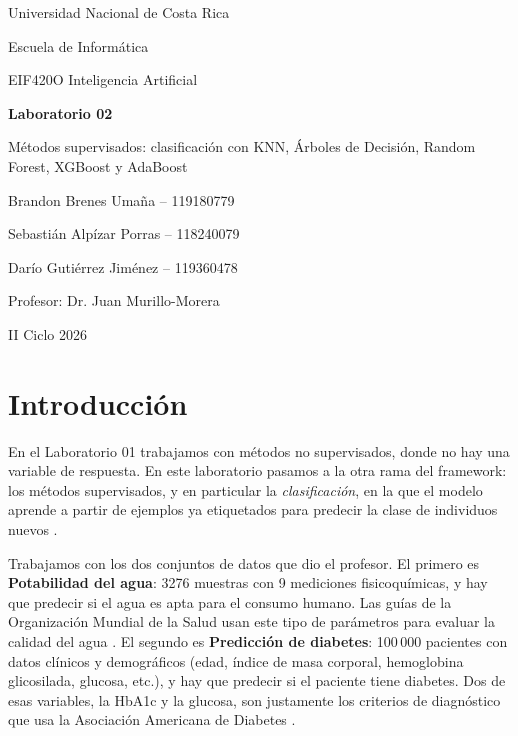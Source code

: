 \documentclass[11pt,a4paper]{article}
\let\citepOriginal\citep
\renewcommand*{\citep}[1]{\textbf{\citepOriginal{#1}}}%
\begin{document}
\begin{titlepage}
\centering
{\large Universidad Nacional de Costa Rica\par}
{\large Escuela de Informática\par}
{\large EIF420O Inteligencia Artificial\par}
\vspace{4cm}
{\LARGE\bfseries Laboratorio 02\par}
\vspace{0.5cm}
{\Large Métodos supervisados: clasificación con KNN, Árboles de Decisión, Random Forest, XGBoost y AdaBoost\par}
\vspace{4cm}
{\large Brandon Brenes Umaña -- 119180779\par}
{\large Sebastián Alpízar Porras -- 118240079\par}
{\large Darío Gutiérrez Jiménez -- 119360478\par}
\vspace{2cm}
{\large Profesor: Dr. Juan Murillo-Morera\par}
\vfill
{\large II Ciclo 2026\par}
\end{titlepage}

\tableofcontents
\newpage

\section{Introducción}

En el Laboratorio 01 trabajamos con métodos no supervisados, donde no hay una variable de respuesta. En este laboratorio pasamos a la otra rama del framework: los métodos supervisados, y en particular la \textit{clasificación}, en la que el modelo aprende a partir de ejemplos ya etiquetados para predecir la clase de individuos nuevos \citep{hastie2009,james2013}.

Trabajamos con los dos conjuntos de datos que dio el profesor. El primero es \textbf{Potabilidad del agua}: 3276 muestras con 9 mediciones fisicoquímicas, y hay que predecir si el agua es apta para el consumo humano. Las guías de la Organización Mundial de la Salud usan este tipo de parámetros para evaluar la calidad del agua \citep{who2022}. El segundo es \textbf{Predicción de diabetes}: 100\,000 pacientes con datos clínicos y demográficos (edad, índice de masa corporal, hemoglobina glicosilada, glucosa, etc.), y hay que predecir si el paciente tiene diabetes. Dos de esas variables, la HbA1c y la glucosa, son justamente los criterios de diagnóstico que usa la Asociación Americana de Diabetes \citep{ada2024}.
\end{document}

